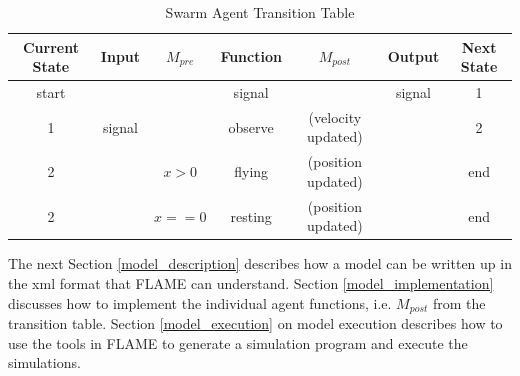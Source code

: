 \begin{table}[ht]
\centering
\begin{tabular}{|c|c|c||c||c|c|c|}
\hline
Current State&Input&$M_{pre}$&Function&$M_{post}$&Output&Next State\\
\hline
\hline
start&&&signal&&signal&1\\
\hline
1&signal&&observe&(velocity updated)&&2\\
\hline
2&&$x > 0$&flying&(position updated)&&end\\
\hline
2&&$x == 0$&resting&(position updated)&&end\\
\hline
\end{tabular}
\caption{Swarm Agent Transition Table}
\label{tab:swarmtransition}
\end{table}

The next Section \ref{model_description} describes how a model can be written up in the xml format that FLAME can understand. Section
\ref{model_implementation} discusses how to implement
the individual agent functions, i.e. $M_{post}$ from the transition table.
Section \ref{model_execution} on model execution describes how to use the tools
in FLAME to generate a simulation program and execute the simulations.

